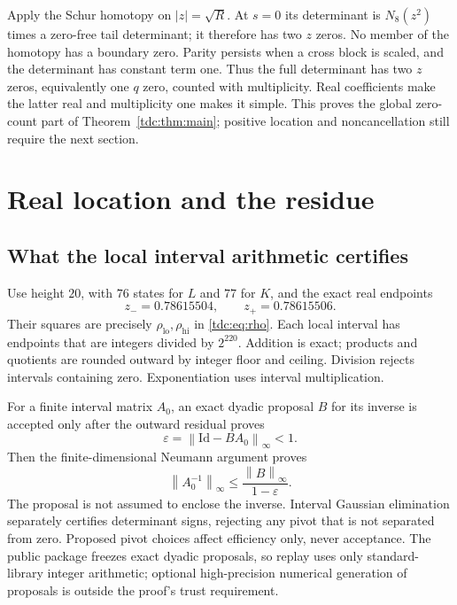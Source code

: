 \documentclass[11pt]{article}
\theoremstyle{definition}\newtheorem{definition}[theorem]{Definition}
\theoremstyle{remark}\newtheorem{remark}[theorem]{Remark}
\newcommand{\Id}{\mathrm{Id}}
\newcommand{\norm}[1]{\left\lVert#1\right\rVert}
\newcommand{\rhol}{\rho_{\mathrm{lo}}}
\newcommand{\rhoh}{\rho_{\mathrm{hi}}}
\begin{document}
Apply the Schur homotopy on $|z|=\sqrt R$. At $s=0$ its determinant is $N_8(z^2)$ times a zero-free tail determinant; it therefore has two $z$ zeros. No member of the homotopy has a boundary zero. Parity persists when a cross block is scaled, and the determinant has constant term one. Thus the full determinant has two $z$ zeros, equivalently one $q$ zero, counted with multiplicity. Real coefficients make the latter real and multiplicity one makes it simple. This proves the global zero-count part of Theorem~\ref{tdc:thm:main}; positive location and noncancellation still require the next section.

\section{Real location and the residue}
\label{tdc:sec:local}
\subsection{What the local interval arithmetic certifies}
Use height $20$, with $76$ states for $L$ and $77$ for $K$, and the exact real endpoints
\begin{equation}\label{tdc:eq:zinterval}
 z_-=0.78615504,\qquad z_+=0.78615506.
\end{equation}
Their squares are precisely $\rhol,\rhoh$ in \eqref{tdc:eq:rho}. Each local interval has endpoints that are integers divided by $2^{220}$. Addition is exact; products and quotients are rounded outward by integer floor and ceiling. Division rejects intervals containing zero. Exponentiation uses interval multiplication.

For a finite interval matrix $A_0$, an exact dyadic proposal $B$ for its inverse is accepted only after the outward residual proves
\[
 \varepsilon=\norm{\Id-BA_0}_\infty<1.
\]
Then the finite-dimensional Neumann argument proves
\begin{equation}\label{tdc:eq:inversecertificate}
 \norm{A_0^{-1}}_\infty\le\frac{\norm B_\infty}{1-\varepsilon}.
\end{equation}
The proposal is not assumed to enclose the inverse. Interval Gaussian elimination separately certifies determinant signs, rejecting any pivot that is not separated from zero. Proposed pivot choices affect efficiency only, never acceptance. The public package freezes exact dyadic proposals, so replay uses only standard-library integer arithmetic; optional high-precision numerical generation of proposals is outside the proof's trust requirement.
\end{document}
